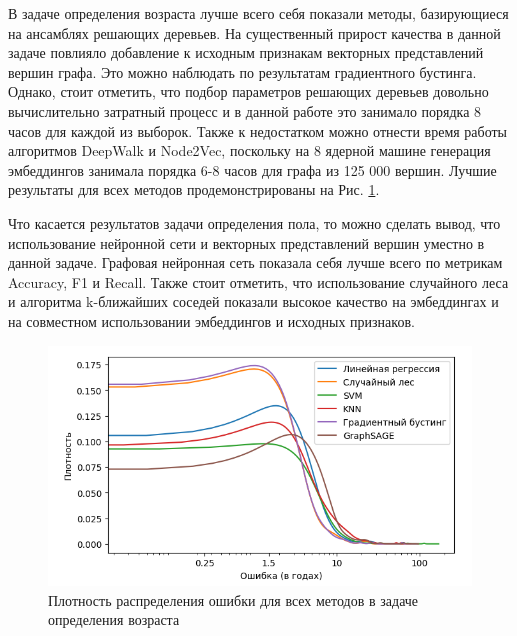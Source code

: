 В задаче определения возраста лучше всего себя показали методы, базирующиеся на ансамблях решающих деревьев. На существенный прирост качества в данной задаче повлияло добавление к исходным признакам векторных представлений вершин графа. Это можно наблюдать по результатам градиентного бустинга. Однако, стоит отметить, что подбор параметров решающих деревьев довольно вычислительно затратный процесс и в данной работе это занимало порядка 8 часов для каждой из выборок. Также к недостатком можно отнести время работы алгоритмов DeepWalk и Node2Vec, поскольку на 8 ядерной машине генерация эмбеддингов занимала порядка 6-8 часов для графа из 125 000 вершин. Лучшие результаты для всех методов продемонстрированы на Рис. \ref{fig:age_errors}.

Что касается результатов задачи определения пола, то можно сделать вывод, что использование нейронной сети и векторных представлений вершин уместно в данной задаче. Графовая нейронная сеть показала себя лучше всего по метрикам Accuracy, F1 и Recall. Также стоит отметить, что использование случайного леса и алгоритма k-ближайших соседей показали высокое качество на  эмбеддингах и на совместном использовании эмбеддингов и исходных признаков.



\begin{figure}[h]

\includegraphics[width=\linewidth]{images/age_errors}

\caption{Плотность распределения ошибки для всех методов в задаче определения возраста}
\label{fig:age_errors}
\end{figure}

\clearpage